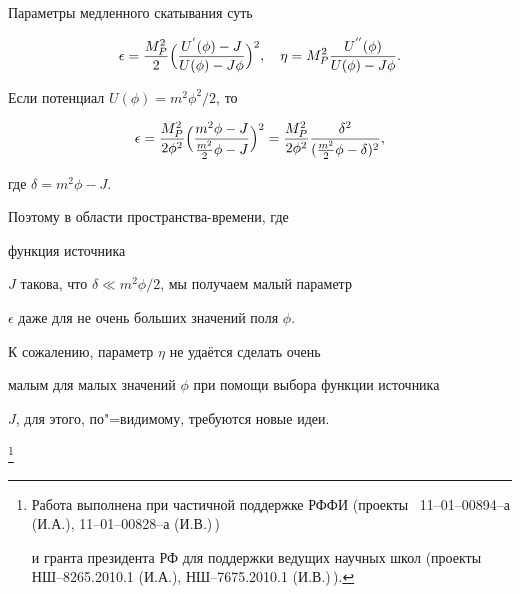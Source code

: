 Параметры медленного скатывания суть

\begin{equation*}

\epsilon=\frac{M_P^2}{2}\Bigl(\frac{U^{'}(\phi)-J}{U(\phi)-J\phi}\Bigr)^2,\quad 

\eta=M_P^2

\frac{U^{''}(\phi)}{U(\phi)-J\phi}.


\end{equation*}

Если потенциал $U(\phi)=m^2\phi^2/2$, то

\begin{equation*}

\epsilon=

\frac{M_P^2}{2\phi^2}\Bigl(\frac{m^2\phi-J}{\frac{m^2}{2}\phi-J}\Bigr)^2

=\frac{M_P^2}{2\phi^2}\frac{\delta^2}{(\frac{m^2}{2}\phi-\delta)^2},


\end{equation*}

где $\delta=m^2\phi-J$.



Поэтому в области пространства-времени, где

функция источника

$J$ такова, что  $\delta\ll m^2\phi/2$, мы получаем малый параметр

 $\epsilon$ даже для не очень больших значений поля $\phi$.

К сожалению, параметр $\eta$ не удаётся сделать очень

малым для малых значений $\phi$ при помощи выбора функции источника

 $J$, для этого, по"=видимому, требуются новые идеи.







\thanks{Работа выполнена при частичной поддержке РФФИ (проекты \No\No~11--01--00894--а (И.А.), 11--01--00828--а (И.В.)\,) 

и гранта президента РФ для поддержки ведущих научных школ (проекты НШ--8265.2010.1 (И.А.), НШ--7675.2010.1 (И.В.)\,).}







